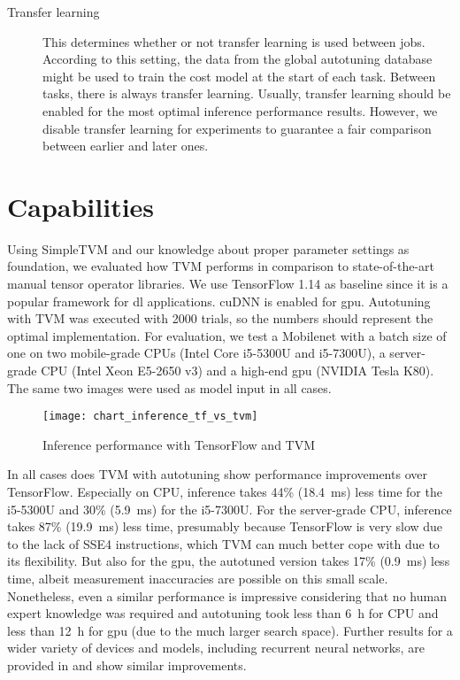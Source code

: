 \begin{description}
	\item[Transfer learning] This determines whether or not transfer learning is used between jobs. According to this setting, the data from the global autotuning database might be used to train the cost model at the start of each task. Between tasks, there is always transfer learning. Usually, transfer learning should be enabled for the most optimal inference performance results. However, we disable transfer learning for experiments to guarantee a fair comparison between earlier and later ones.
\end{description}


\section{Capabilities}
Using SimpleTVM and our knowledge about proper parameter settings as foundation, we evaluated how TVM performs in comparison to state-of-the-art manual tensor operator libraries. We use TensorFlow 1.14 as baseline since it is a popular framework for \gls{dl} applications. cuDNN is enabled for \gls{gpu}. Autotuning with TVM was executed with 2000 trials, so the numbers should represent the optimal implementation. For evaluation, we test a Mobilenet with a batch size of one on two mobile-grade CPUs (Intel Core i5-5300U and i5-7300U), a server-grade CPU (Intel Xeon E5-2650 v3) and a high-end \gls{gpu} (NVIDIA Tesla K80). The same two images were used as model input in all cases.

\begin{figure}[h]
	\centering
	\texttt{[image: chart\_inference\_tf\_vs\_tvm]}%
	\caption{Inference performance with TensorFlow and TVM}
	\label{fig:inf-tf-tvm}
\end{figure}

In all cases does TVM with autotuning show performance improvements over TensorFlow. Especially on CPU, inference takes 44\% (\SI{18.4}{\milli\second}) less time for the i5-5300U and 30\% (\SI{5.9}{\milli\second}) for the i5-7300U. For the server-grade CPU, inference takes 87\% (\SI{19.9}{\milli\second}) less time, presumably because TensorFlow is very slow due to the lack of SSE4 instructions, which TVM can much better cope with due to its flexibility. But also for the \gls{gpu}, the autotuned version takes 17\% (\SI{0.9}{\milli\second}) less time, albeit measurement inaccuracies are possible on this small scale. Nonetheless, even a similar performance is impressive considering that no human expert knowledge was required and autotuning took less than \SI{6}{\hour} for CPU and less than \SI{12}{\hour} for \gls{gpu} (due to the much larger search space). Further results for a wider variety of devices and models, including recurrent neural networks, are provided in \cite{Chen.2018} and show similar improvements.

